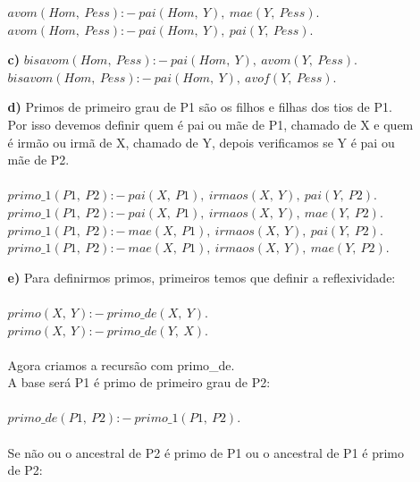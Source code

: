 \documentclass[12pt]{article}
\begin{document}
\begin{itemize}
\begin{itemize}
					\hfill\newline
					$avom(Hom, \ Pess) :- \ pai(Hom,\  Y), \ mae(Y, \ Pess).$\\
					$avom(Hom, \ Pess) :- \ pai(Hom, \ Y), \ pai(Y, \ Pess).$\\
				\item[\textbf{c) }]
					\hfill\newline
					$bisavom(Hom, \ Pess) :- \ pai(Hom, \ Y), \ avom(Y, \ Pess).$\\
					$bisavom(Hom, \ Pess) :- \ pai(Hom, \ Y), \ avof(Y, \ Pess).$\\
				\newpage
				\item[\textbf{d) }]
					\hfill\newline
					Primos de primeiro grau de P1 são os filhos e filhas dos tios de P1.\\
					Por isso devemos definir quem é pai ou mãe de P1, chamado de X
					e quem é irmão ou irmã de X, chamado de Y, depois verificamos se Y é
					pai ou mãe de P2.\\ \\
					$primo\_1(P1, \ P2) :- \ pai(X, \ P1), \ irmaos(X, \ Y), \ pai(Y, \ P2).$\\
					$primo\_1(P1, \ P2) :- \ pai(X, \ P1), \ irmaos(X, \ Y), \ mae(Y, \ P2).$\\
					$primo\_1(P1, \ P2) :- \ mae(X, \ P1), \ irmaos(X, \ Y), \ pai(Y, \ P2).$\\
					$primo\_1(P1, \ P2) :- \ mae(X, \ P1), \ irmaos(X, \ Y), \ mae(Y, \ P2).$\\
				\item[\textbf{e) }]
					\hfill\newline
					Para definirmos primos, primeiros temos que definir a reflexividade:\\ \\
					$primo(X, \ Y) :- \ primo\_de(X, \ Y).$\\
					$primo(X, \ Y) :- \ primo\_de(Y, \ X).$\\ \\
					Agora criamos a recursão com primo\_de.\\
					A base será P1 é primo de primeiro grau de P2:\\	 \\		
					$primo\_de(P1, \	 P2) :- \ primo\_1(P1, \	P2).$\\ \\
					Se não ou o ancestral de P2 é primo de P1 ou o ancestral de P1 é
					primo de P2:\\ \\

\end{itemize}
\end{itemize}
\end{document}
